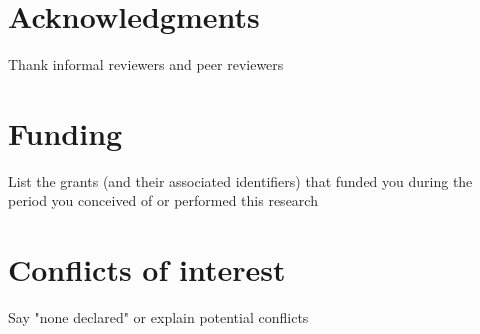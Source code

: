 \documentclass[10pt,letterpaper]{article}
\begin{document}
\section*{Acknowledgments}

Thank informal reviewers and peer reviewers

\section*{Funding}

List the grants (and their associated identifiers) that funded you during the period you conceived of or performed this research

\section*{Conflicts of interest}

Say "none declared" or explain potential conflicts

\nolinenumbers




\end{document}
